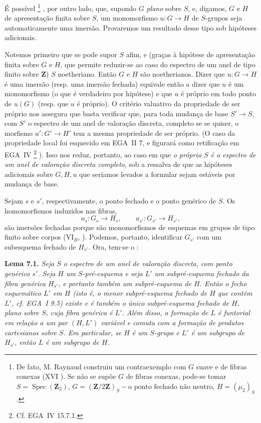 É possível\begingroup
\renewcommand{\thefootnote}{(\(\ast\))}%
\footnote[1]{De fato, M. Raynaud construiu um contraexemplo com \(G\) suave
e de fibras conexas (XVI ).
Se não se supõe \(G\) de fibras conexas, pode-se tomar
\(S=\operatorname{Spec}(\mathbf Z_2)\),
\(G=(\mathbf Z/2\mathbf Z)_S-\text{o ponto fechado não neutro}\),
\(H=(\mu_2)_S\).}%
\endgroup, por outro lado, que, supondo \(G\) \emph{plano} sobre \(S\), e, digamos, \(G\) e \(H\) de
apresentação finita sobre \(S\), um monomorfismo \(u:G\to H\) de
\(S\)-grupos seja automaticamente uma imersão. Provaremos um resultado
desse tipo sob hipóteses adicionais.

Notemos primeiro que se pode supor \(S\) afim, e (graças à
hipótese de apresentação finita sobre \(G\) e \(H\), que permite
reduzir-se ao caso do espectro de um anel de tipo finito sobre
\(\mathbf Z\)) \(S\) noetheriano. Então \(G\) e \(H\) são noetherianos.
Dizer que \(u:G\to H\) é uma imersão (resp. uma imersão fechada)
equivale então a dizer que \(u\) é um monomorfismo (o que é verdadeiro
por hipótese) e que \(u\) é próprio em todo ponto de \(u(G)\)
(resp. que \(u\) é próprio). O critério valuativo da propriedade de ser
próprio nos assegura que basta verificar que, para toda mudança de
base \(S'\to S\), com \(S'\) o espectro de um anel de valoração
discreta, completo se se quiser, o morfismo \(u':G'\to H'\) tem a
mesma propriedade de ser próprio. (O caso da propriedade local foi
esquecido em EGA~II 7, e figurará como retificação em EGA~IV\begingroup
\renewcommand{\thefootnote}{(\(\ast\))}%
\footnote[0]{Cf. EGA~IV 15.7.1.}%
\endgroup).
Isso nos reduz, portanto, ao caso em que \emph{o próprio \(S\) é o
espectro de um anel de valoração discreta completo}, sob a ressalva
de que as hipóteses adicionais sobre \(G,H,u\) que seríamos levados
a formular sejam estáveis por mudança de base.

Sejam \(s\) e \(s'\), respectivamente, o ponto fechado e o ponto genérico
de \(S\). Os homomorfismos induzidos nas fibras,
\[
  u_s:G_s\longrightarrow H_s,
  \qquad
  u_{s'}:G_{s'}\longrightarrow H_{s'},
\]
são imersões fechadas porque são monomorfismos de esquemas em grupos de
tipo finito sobre corpos (VI\(_B\),
). Podemos, portanto, identificar
\(G_{s'}\) com um subesquema fechado de \(H_{s'}\). Ora, tem-se o
:

\medskip
\noindent{}\textbf{Lema 7.1.}
\textit{Seja \(S\) o espectro de um anel de valoração discreta, com
ponto genérico \(s'\). Seja \(H\) um \(S\)-pré-esquema e seja \(L'\) um
subpré-esquema fechado da fibra genérica \(H_{s'}\), e portanto também
um subpré-esquema de \(H\). Então o fecho esquemático \(L'\) em
\(H\) (isto é, o menor subpré-esquema fechado de \(H\) que contém
\(L'\), cf. EGA~I 9.5) existe e é também o único subpré-esquema fechado
de \(H\), plano sobre \(S\), cuja fibra genérica é \(L'\). Além disso,
a formação de \(L\) é funtorial em relação a um par \((H,L')\)
variável e comuta com a formação de produtos cartesianos sobre \(S\). Em
particular, se \(H\) é um \(S\)-grupo e \(L'\) é um subgrupo de
\(H_{s'}\), então \(L\) é um subgrupo de \(H\).}

